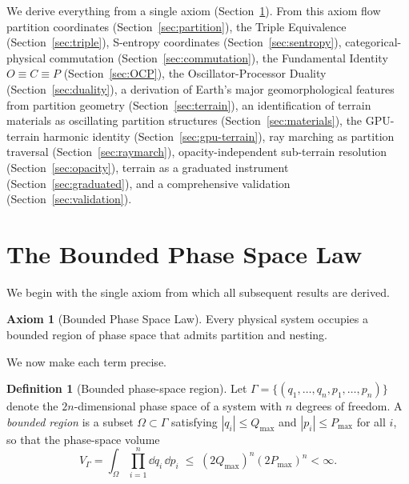 \documentclass[10pt,twocolumn]{article}
\theoremstyle{definition}
\newtheorem{definition}[theorem]{Definition}
\newtheorem{axiom}{Axiom}
\theoremstyle{remark}
\begin{document}
We derive everything from a single axiom
(Section~\ref{sec:axiom}).  From this axiom flow partition
coordinates (Section~\ref{sec:partition}), the Triple
Equivalence (Section~\ref{sec:triple}), S-entropy coordinates
(Section~\ref{sec:sentropy}), categorical-physical commutation
(Section~\ref{sec:commutation}), the Fundamental Identity
$O\equiv C\equiv P$ (Section~\ref{sec:OCP}), the
Oscillator-Processor Duality (Section~\ref{sec:duality}), a
derivation of Earth's major geomorphological features from
partition geometry (Section~\ref{sec:terrain}), an
identification of terrain materials as oscillating partition
structures (Section~\ref{sec:materials}), the GPU-terrain
harmonic identity (Section~\ref{sec:gpu-terrain}), ray marching
as partition traversal (Section~\ref{sec:raymarch}),
opacity-independent sub-terrain resolution
(Section~\ref{sec:opacity}), terrain as a graduated instrument
(Section~\ref{sec:graduated}), and a comprehensive validation
(Section~\ref{sec:validation}).

\section{The Bounded Phase Space Law}\label{sec:axiom}

We begin with the single axiom from which all subsequent
results are derived.

\begin{axiom}[Bounded Phase Space Law]\label{ax:bps}
Every physical system occupies a bounded region of phase space
that admits partition and nesting.
\end{axiom}

We now make each term precise.

\begin{definition}[Bounded phase-space region]\label{def:bounded}
Let $\Gamma = \{(q_1,\dots,q_n,p_1,\dots,p_n)\}$ denote the
$2n$-dimensional phase space of a system with $n$ degrees of
freedom.  A \emph{bounded region} is a subset
$\Omega\subset\Gamma$ satisfying $|q_i|\le Q_{\max}$ and
$|p_i|\le P_{\max}$ for all $i$, so that the phase-space
volume
\begin{equation}\label{eq:vol}
  V_\Gamma
  = \int_\Omega \prod_{i=1}^{n}\dd q_i\,\dd p_i
  \;\le\;(2Q_{\max})^n(2P_{\max})^n
  < \infty.
\end{equation}
\end{definition}
\end{document}
